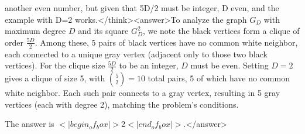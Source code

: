 another even number, but given that 5D/2 must be integer, D even, and the example with D=2 works.</think><answer>To analyze the graph \( G_D \) with maximum degree \( D \) and its square \( G_D^2 \), we note the black vertices form a clique of order \( \frac{5D}{2} \). Among these, 5 pairs of black vertices have no common white neighbor, each connected to a unique gray vertex (adjacent only to those two black vertices). For the clique size \( \frac{5D}{2} \) to be an integer, \( D \) must be even. Setting \( D = 2 \) gives a clique of size 5, with \( \binom{5}{2} = 10 \) total pairs, 5 of which have no common white neighbor. Each such pair connects to a gray vertex, resulting in 5 gray vertices (each with degree 2), matching the problem's conditions.  

The answer is \(<|begin_of_box|>2<|end_of_box|>\).</answer>